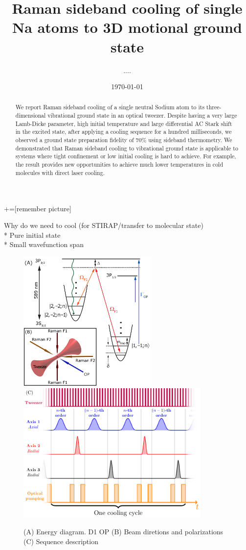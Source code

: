 \documentclass[aps,prl,twocolumn,groupedaddress]{revtex4-1}
\begin{document}
+=[remember picture]
\title{Raman sideband cooling of single Na atoms to 3D motional ground state}
\author{....}
\date{\today}

\begin{abstract}
  We report Raman sideband cooling of a single neutral Sodium atom to its three-dimensional
  vibrational ground state in an optical tweezer.
  Despite having a very large Lamb-Dicke parameter, high initial temperature and
  large differential AC Stark shift in the excited state,
  after applying a cooling sequence for a hundred milliseconds,
  we observed a ground state preparation fidelity of $70\%$ using sideband thermometry.
  We demonstrated that Raman sideband cooling to vibrational ground state is applicable to
  systems where tight confinement or low initial cooling is hard to achieve.
  For example, the result provides new opportunities to achieve much lower temperatures
  in cold molecules with direct laser cooling.
\end{abstract}

\maketitle

Why do we need to cool (for STIRAP/transfer to molecular state)\\

* Pure initial state\\
* Small wavefunction span\\

\begin{figure}
  \includegraphics[height=7cm]{imgs/Na_RSC_schematic.pdf}
  \includegraphics[height=7cm]{sequence.pdf}
  \caption{(A) Energy diagram. D1 OP
    (B) Beam diretions and polarizations
    (C) Sequence description
    \label{f-setup}}
\end{figure}
\end{document}
